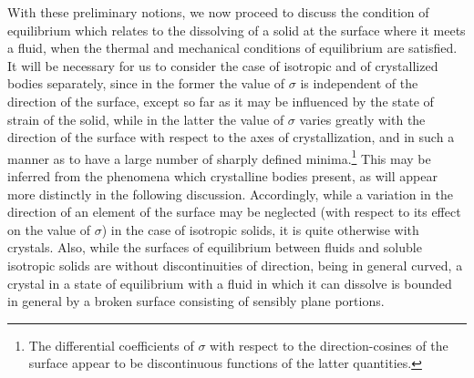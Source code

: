 \documentclass[12pt]{article}
\begin{document}
With these preliminary notions, we now proceed to discuss the condition of equilibrium which relates to the dissolving of a solid at the surface where it meets a fluid, when the thermal and mechanical conditions of equilibrium are satisfied. It will be necessary for us to consider the case of isotropic and of crystallized bodies separately, since in the former the value of $\sigma$ is independent of the direction of the surface, except so far as it may be influenced by the state of strain of the solid, while in the latter the value of $\sigma$ varies greatly with the direction of the surface with respect to the axes of crystallization, and in such a manner as to have a large number of sharply defined minima.\footnote{The differential coefficients of $\sigma$ with respect to the direction-cosines of the surface appear to be discontinuous functions of the latter quantities.} This may be inferred from the phenomena which crystalline bodies present, as will appear more distinctly in the following discussion. Accordingly, while a variation in the direction of an element of the surface may be neglected (with respect to its effect on the value of $\sigma$) in the case of isotropic solids, it is quite otherwise with crystals. Also, while the surfaces of equilibrium between fluids and soluble isotropic solids are without discontinuities of direction, being in general curved, a crystal in a state of equilibrium with a fluid in which it can dissolve is bounded in general by a broken surface consisting of sensibly plane portions.
\end{document}

